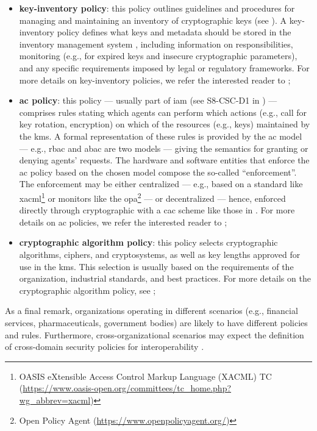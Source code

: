 \begin{itemize}
\begin{itemize}
		\item \textbf{key-inventory policy}: this policy outlines guidelines and procedures for managing and maintaining an inventory of cryptographic keys (see ). A key-inventory policy defines what keys and metadata should be stored in the inventory management system \cite{barker_recommendation_2020_p1}, including information on responsibilities, monitoring (e.g., for expired keys and insecure cryptographic parameters), and any specific requirements imposed by legal or regulatory frameworks. For more details on key-inventory policies, we refer the interested reader to \cite{barker_recommendation_2019_p2};
		\item \textbf{\gls{ac} policy}: this policy --- usually part of \gls{iam} (see S8-CSC-D1 in ) --- comprises rules stating which agents can perform which actions (e.g., call for key rotation, encryption) on which of the resources (e.g., keys) maintained by the \gls{kms}. A formal representation of these rules is provided by the \gls{ac} model --- e.g., \gls{rbac} \cite{sandhu_access_1998} and \gls{abac} \cite{horwitz_toward_2002} are two models --- giving the semantics for granting or denying agents’ requests. The hardware and software entities that enforce the \gls{ac} policy based on the chosen model compose the so-called ``enforcement''. The enforcement may be either centralized --- e.g., based on a standard like \gls{xacml}\footnote{OASIS eXtensible Access Control Markup Language (XACML) TC (\url{https://www.oasis-open.org/committees/tc_home.php?wg_abbrev=xacml})} or monitors like the \gls{opa}\footnote{Open Policy Agent (\url{https://www.openpolicyagent.org/})} --- or decentralized --- hence, enforced directly through cryptographic with a \gls{cac} scheme like those in \cite{berlato_formal_2022,berlato_end_2022}. For more details on \gls{ac} policies, we refer the interested reader to \cite{nist_security_2020};
		\item \textbf{cryptographic algorithm policy}: this policy selects cryptographic algorithms, ciphers, and cryptosystems, as well as key lengths approved for use in the \gls{kms}. This selection is usually based on the requirements of the organization, industrial standards, and best practices. For more details on the cryptographic algorithm policy, see ;
	\end{itemize}
\end{itemize}

As a final remark, organizations operating in different scenarios (e.g., financial services, pharmaceuticals, government bodies) are likely to have different policies and rules. Furthermore, cross-organizational scenarios may expect the definition of cross-domain security policies for interoperability \cite{barker_framework_2013}.



